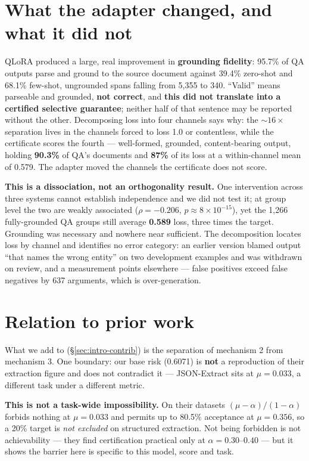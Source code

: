 \documentclass[11pt]{article}
\begin{document}
\section{What the adapter changed, and what it did not}
\label{sec:grounding}

QLoRA produced a large, real improvement in \textbf{grounding fidelity}: 95.7\% of QA outputs
parse and ground to the source document against 39.4\% zero-shot and 68.1\% few-shot, ungrounded
spans falling from 5,355 to 340. ``Valid'' means parseable and grounded, \textbf{not correct}, and
\textbf{this did not translate into a certified selective guarantee}; neither half of that sentence
may be reported without the other. Decomposing loss into four channels says why: the
${\sim}16\times$ separation lives in the channels forced to loss 1.0 or contentless, while the
certificate scores the fourth --- well-formed, grounded, content-bearing output, holding
\textbf{90.3\%} of QA's documents and \textbf{87\%} of its loss at a within-channel mean of 0.579.
The adapter moved the channels the certificate does not score.

\textbf{This is a dissociation, not an orthogonality result.} One intervention across three systems
cannot establish independence and we did not test it; at group level the two are weakly associated
($\rho = -0.206$, $p \approx 8\times10^{-15}$), yet the 1{,}266 fully-grounded QA groups still
average \textbf{0.589} loss, three times the target. Grounding was necessary and nowhere near
sufficient. The decomposition locates loss by channel and identifies no error category: an earlier
version blamed output ``that names the wrong entity'' on two development examples and was withdrawn
on review, and a measurement points elsewhere --- false positives exceed false negatives by 637
arguments, which is over-generation.

\section{Relation to prior work}

What we add to \citet{kotte2026crc} (\S\ref{sec:intro-contrib}) is the separation of mechanism 2
from mechanism 3. One boundary: our base risk (0.6071) is \textbf{not} a reproduction of their
extraction figure and does not contradict it --- JSON-Extract sits at $\mu = 0.033$, a different
task under a different metric.

\textbf{This is not a task-wide impossibility.} On their datasets $(\mu-\alpha)/(1-\alpha)$ forbids
nothing at $\mu = 0.033$ and permits up to 80.5\% acceptance at $\mu = 0.356$, so a 20\% target is
\emph{not excluded} on structured extraction. Not being forbidden is not achievability --- they
find certification practical only at $\alpha = 0.30$--$0.40$ --- but it shows the barrier here is
specific to this model, score and task.
\end{document}
